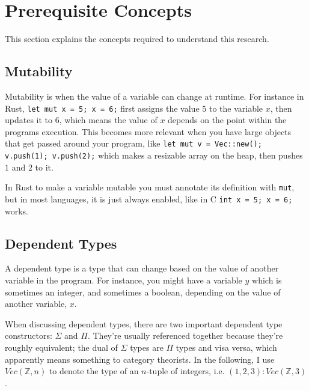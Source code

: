 \documentclass[12pt,twoside]{report}
\begin{document}
\section{Prerequisite Concepts}
This section explains the concepts required to understand this research.

\subsection{Mutability}
Mutability is when the value of a variable can change at runtime. For instance in Rust, \verb|let mut x = 5; x = 6;| first assigns the value $5$ to the variable $x$, then updates it to $6$, which means the value of $x$ depends on the point within the programs execution. This becomes more relevant when you have large objects that get passed around your program, like \verb|let mut v = Vec::new(); v.push(1); v.push(2);| which makes a resizable array on the heap, then pushes $1$ and $2$ to it.

In Rust to make a variable mutable you must annotate its definition with \verb|mut|, but in most languages, it is just always enabled, like in C \verb|int x = 5; x = 6;| works.

\subsection{Dependent Types}
A dependent type is a type that can change based on the value of another variable in the program. For instance, you might have a variable $y$ which is sometimes an integer, and sometimes a boolean, depending on the value of another variable, $x$.

When discussing dependent types, there are two important dependent type constructors: $\Sigma$ and $\Pi$. They're usually referenced together because they're roughly equivalent; the dual of $\Sigma$ types are $\Pi$ types and visa versa, which apparently means something to category theorists. In the following, I use $Vec(\mathbb{Z}, n)$ to denote the type of an $n$-tuple of integers, i.e. $(1, 2, 3): Vec(\mathbb{Z}, 3)$.
\end{document}
